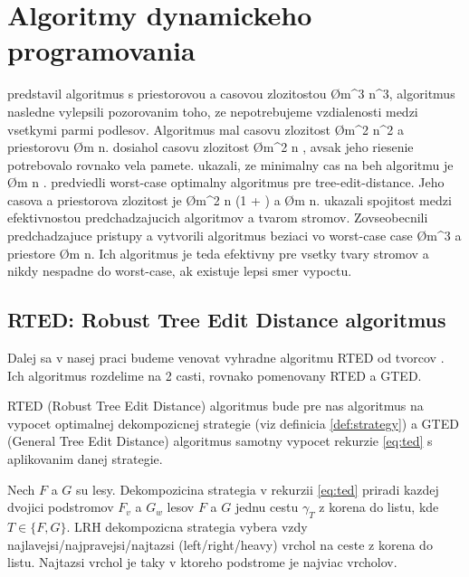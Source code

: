 \section{Algoritmy dynamickeho programovania}

\citet{TAI} predstavil algoritmus s priestorovou a casovou zlozitostou \O{m^3 \cdot n^3},
\citet{ZHANGSHASHA} algoritmus nasledne vylepsili pozorovanim toho, ze nepotrebujeme
vzdialenosti medzi vsetkymi parmi podlesov. Algoritmus mal casovu zlozitost \O{m^2 \cdot n^2}
a priestorovu \O{m \cdot n}. \citet{KLEIN} dosiahol casovu zlozitost \O{m^2 \cdot n \cdot {}},
avsak jeho riesenie potrebovalo rovnako vela pamete.
\citet{DALUCQ} ukazali, ze minimalny cas na beh algoritmu je \O{m \cdot n \cdot {} \cdot {}}.
\citet{DMRW} predviedli worst-case optimalny algoritmus pre tree-edit-distance.
Jeho casova a priestorova zlozitost je \O{m^2 \cdot n \cdot (1 + )} a
\O{m \cdot n}. \citet{RTED} ukazali spojitost medzi efektivnostou predchadzajucich algoritmov
a tvarom stromov. Zovseobecnili predchadzajuce pristupy a vytvorili algoritmus beziaci
vo worst-case case \O{m^3} a priestore \O{m \cdot n}. Ich algoritmus je teda efektivny pre vsetky
tvary stromov a nikdy nespadne do worst-case, ak existuje lepsi smer vypoctu. 



\subsection{RTED: Robust Tree Edit Distance algoritmus}

Dalej sa v nasej praci budeme venovat vyhradne algoritmu RTED od tvorcov \citet{RTED}.
Ich algoritmus rozdelime na 2 casti, rovnako pomenovany RTED a GTED.

RTED (Robust Tree Edit Distance) algoritmus bude pre nas algoritmus na vypocet
optimalnej dekompozicnej strategie (viz definicia \ref{def:strategy})
a GTED (General Tree Edit Distance) algoritmus samotny vypocet rekurzie \ref{eq:ted}
s aplikovanim danej strategie.

\begin{definice}\label{def:strategy}
	Nech $F$ a $G$ su lesy. Dekompozicina strategia v rekurzii \ref{eq:ted} priradi
  kazdej dvojici podstromov $F_{v}$ a $G_{w}$ lesov $F$ a $G$ jednu cestu $\gamma_{T}$
  z korena do listu, kde $T \in \{F, G\}$.
	LRH dekompozicna strategia vybera vzdy najlavejsi/najpravejsi/najtazsi
	(left/right/heavy) vrchol na ceste z korena do listu. Najtazsi vrchol je taky
	v ktoreho podstrome je najviac vrcholov. 
\end{definice}

